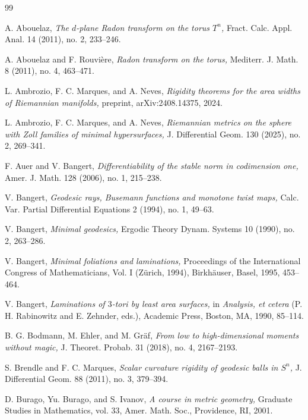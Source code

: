 \documentclass[11pt]{amsart}
\theoremstyle{remark}
\theoremstyle{definition}
\begin{document}
	
	\begin{thebibliography}{99}
		
		
		 A. Abouelaz, {\em The $d$-plane Radon transform on the torus $T^n$,} Fract. Calc. Appl. Anal. 14 (2011), no. 2, 233--246.
		
		 A. Abouelaz and F. Rouvi\`ere, {\em Radon transform on the torus,} Mediterr. J. Math. 8 (2011), no. 4, 463--471.
		
		 L. Ambrozio, F. C. Marques, and A. Neves, {\em Rigidity theorems for the area widths of Riemannian manifolds,} preprint, arXiv:2408.14375, 2024.
		
		 L. Ambrozio, F. C. Marques, and A. Neves, {\em Riemannian metrics on the sphere with Zoll families of minimal hypersurfaces,} J. Differential Geom. 130 (2025), no. 2, 269--341.
		
		 F. Auer and V. Bangert, {\em Differentiability of the stable norm in codimension one,} Amer. J. Math. 128 (2006), no. 1, 215--238.
		
		 V. Bangert, {\em Geodesic rays, Busemann functions and monotone twist maps,} Calc. Var. Partial Differential Equations 2 (1994), no. 1, 49--63.
		
		 V. Bangert, {\em Minimal geodesics,} Ergodic Theory Dynam. Systems 10 (1990), no. 2, 263--286.
		
		 V. Bangert, {\em Minimal foliations and laminations,} Proceedings of the International Congress of Mathematicians, Vol. I (Z\"urich, 1994), Birkh\"auser, Basel, 1995, 453--464.
		
		 V. Bangert, {\em Laminations of $3$-tori by least area surfaces,} in {\em Analysis, et cetera} (P. H. Rabinowitz and E. Zehnder, eds.), Academic Press, Boston, MA, 1990, 85--114.
		
		
		
		
		
		{ B. G. Bodmann, M. Ehler, and M. Gr\"af, {\em From low to high-dimensional moments without magic,} J. Theoret. Probab. 31 (2018), no. 4, 2167--2193.}
		
		 S. Brendle and F. C. Marques, {\em Scalar curvature rigidity of geodesic balls in $S^n$,} J. Differential Geom. 88 (2011), no. 3, 379--394.
		
		 D. Burago, Yu. Burago, and S. Ivanov, {\em A course in metric geometry,} Graduate Studies in Mathematics, vol. 33, Amer. Math. Soc., Providence, RI, 2001.
		

\end{thebibliography}
\end{document}
